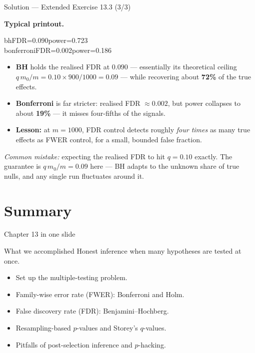 \documentclass[aspectratio=169,11pt]{beamer}
\begin{document}
\begin{frame}{Solution --- Extended Exercise 13.3 (3/3)}
\begin{solutionbox}
  \textbf{Typical printout.}
  \begin{center}\ttfamily\footnotesize
  bh\quad FDR=0.090\quad power=0.723\\[2pt]
  bonferroni\quad FDR=0.002\quad power=0.186
  \end{center}
  \begin{itemize}
    \item \textbf{BH} holds the realised FDR at $0.090$ --- essentially its theoretical
          ceiling $q\,m_0/m=0.10\times900/1000=0.09$ --- while recovering about
          \textbf{72\%} of the true effects.
    \item \textbf{Bonferroni} is far stricter: realised FDR $\approx0.002$, but power
          collapses to about \textbf{19\%} --- it misses four-fifths of the signals.
    \item \textbf{Lesson:} at $m=1000$, FDR control detects roughly \emph{four times} as
          many true effects as FWER control, for a small, bounded false fraction.
  \end{itemize}

  \smallskip
  \textit{Common mistake:} expecting the realised FDR to hit $q=0.10$ exactly. The
  guarantee is $q\,m_0/m=0.09$ here --- BH adapts to the unknown share of true nulls,
  and any single run fluctuates around it.
\end{solutionbox}
\end{frame}

\section{Summary}

\begin{frame}{Chapter 13 in one slide}
  \begin{block}{What we accomplished}
    Honest inference when many hypotheses are tested at once.
  \end{block}
  \begin{itemize}
    \item Set up the multiple-testing problem.
    \item Family-wise error rate (FWER): Bonferroni and Holm.
    \item False discovery rate (FDR): Benjamini--Hochberg.
    \item Resampling-based $p$-values and Storey's $q$-values.
    \item Pitfalls of post-selection inference and $p$-hacking.
  \end{itemize}
\end{frame}
\end{document}
